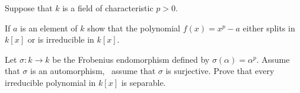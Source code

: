 Suppose that $k$ is a field of characteristic $p>0$.
\begin{alist}
\item If $a$ is an element of $k$ show that the polynomial
$f(x)=x^p-a$ either splits in $k[x]$ or is irreducible in $k[x]$.
\item Let $\sigma:k\rightarrow k$ be the Frobenius endomorphism
defined by $\sigma(\alpha)=\alpha^p$. Assume that $\sigma$ is an
automorphism, \ie\ assume that $\sigma$ is surjective. Prove that
every irreducible polynomial in $k[x]$ is separable.
\end{alist}
